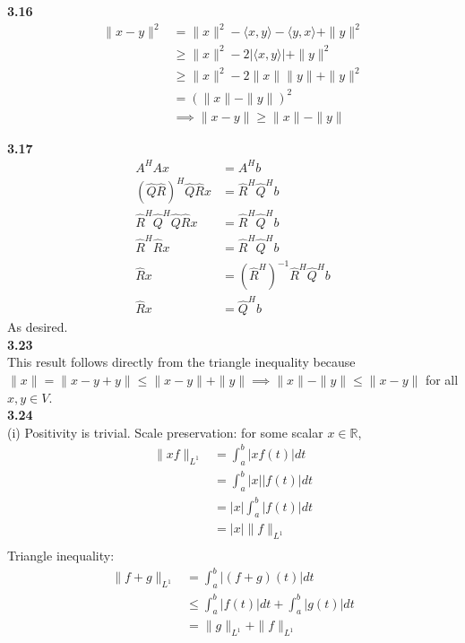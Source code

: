 \documentclass[letterpaper,12pt]{article}
\theoremstyle{definition}
\begin{document}
\noindent\textbf{3.16}\\
\begin{align*}
\|x-y\|^2 &= \|x\|^2 - \langle x,y \rangle - \langle y, x \rangle + \|y\|^2\\
&\geq \|x\|^2 - 2|\langle x,y \rangle | + \|y\|^2\\
&\geq \|x\|^2 - 2\|x\|\|y\| + \|y\|^2\\
&= (\|x\|-\|y\|)^2\\
&\implies \|x-y\| \geq \|x\|-\|y\|
\end{align*}

\noindent\textbf{3.17}\\
\begin{align*}
A^HAx &= A^Hb\\
(\widehat{Q}\widehat{R})^H\widehat{Q}\widehat{R}x &= \widehat{R}^H \widehat{Q}^Hb\\
\widehat{R}^H\widehat{Q}^H\widehat{Q}\widehat{R}x &= \widehat{R}^H \widehat{Q}^Hb\\
\widehat{R}^H\widehat{R}x &= \widehat{R}^H\widehat{Q}^Hb\\
\widehat{R}x &= (\widehat{R}^H)^{-1}\widehat{R}^H\widehat{Q}^Hb\\
\widehat{R}x &= \widehat{Q}^Hb
\end{align*}
As desired.\\

\noindent\textbf{3.23}\\
This result follows directly from the triangle inequality because $\|x\| = \|x - y + y\| \leq \|x-y\| + \|y\| \implies \|x\|-\|y\| \leq \|x-y\|$ for all $x,y \in V$.\\

\noindent\textbf{3.24}\\
(i) Positivity is trivial. Scale preservation: for some scalar $x \in \mathbb{R}$,
\begin{align*}
\|xf\|_{L^1} &= \int_a^b |xf(t)|dt\\
&= \int_a^b |x||f(t)|dt\\
&= |x| \int_a^b |f(t)|dt\\
&= |x|\|f\|_{L^1}\\
\end{align*}
Triangle inequality:
\begin{align*}
\|f+g\|_{L^1} &= \int_a^b |(f+g)(t)|dt\\
&\leq \int_a^b |f(t)|dt + \int_a^b |g(t)|dt\\
&= \|g\|_{L^1} +\|f\|_{L^1} 
\end{align*}
\end{document}
